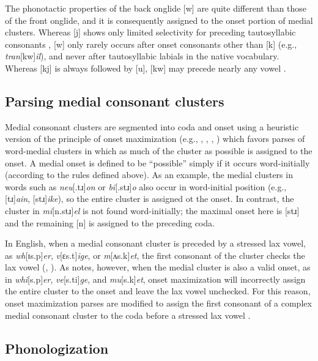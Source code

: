 \documentclass[12pt]{article}
\begin{document}
The phonotactic properties of the back onglide [w] are quite different than those of the front onglide, and it is consequently assigned to the onset portion of medial clusters. Whereas [j] shows only limited selectivity for preceding tautosyllabic consonants \citep{Kaye1996}, [w] only rarely occurs after onset consonants other than [k] (e.g., \emph{tran}[kw]\emph{il}), and never after tautosyllabic labials in the native vocabulary. Whereas [kj] is always followed by [u], [kw] may precede nearly any vowel \citep[161]{Davis1995}.

\subsection{Parsing medial consonant clusters}

Medial consonant clusters are segmented into coda and onset using a heuristic version of the principle of onset maximization (e.g., \citealp[42f.]{Kahn1976}, \citealp{Kurylowicz1948}, \citealp[75]{Pulgram1970}, \citealp[][358f.]{Selkirk1982b}) which favors parses of word-medial clusters in which as much of the cluster as possible is assigned to the onset. A medial onset is defined to be ``possible'' simply if it occurs word-initially (according to the rules defined above). As an example, the medial clusters in words such as \emph{neu}[.tɹ]\emph{on} or \emph{bi}[.stɹ]\emph{o} also occur in word-initial position (e.g., [tɹ]\emph{ain}, [stɹ]\emph{ike}), so the entire cluster is assigned ot the onset. In contrast, the cluster in \emph{mi}[n.stɹ]\emph{el} is not found word-initially; the maximal onset here is [stɹ] and the remaining [n] is assigned to the preceding coda.

In English, when a medial consonant cluster is preceded by a stressed lax vowel, as \emph{wh}[ɪs.p]\emph{er}, \emph{v}[ɛs.t]\emph{ige}, or \emph{m}[ʌs.k]\emph{et}, the first consonant of the cluster checks the lax vowel (\citealp[3]{Hammond1997}, \citealp{Treiman1990}). As \citet[55]{Harris1994} notes, however, when the medial cluster is also a valid onset, as in \emph{whi}[s.p]\emph{er}, \emph{ve}[s.ti]\emph{ge}, and \emph{mu}[s.k]\emph{et}, onset maximization will incorrectly assign the entire cluster to the onset and leave the lax vowel unchecked. For this reason, onset maximization parses are modified to assign the first consonant of a complex medial consonant cluster to the coda before a stressed lax vowel \citep[48]{Pulgram1970}.

\subsection{Phonologization}
\end{document}
